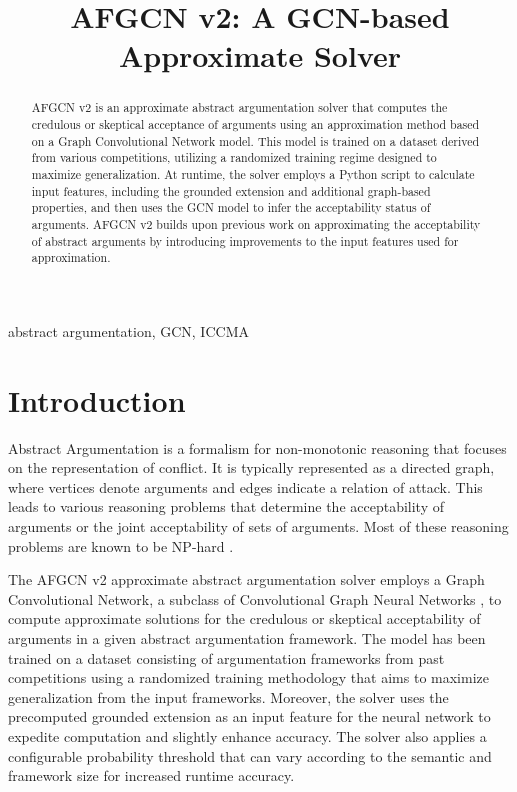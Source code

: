\documentclass[conference]{IEEEtran}
\begin{document}
\title{AFGCN v2: A GCN-based Approximate Solver}

\author{
}

\maketitle

\begin{abstract}
	AFGCN v2 is an approximate abstract argumentation solver that computes the credulous or skeptical acceptance of arguments using an approximation method based on a Graph Convolutional Network model. This model is trained on a dataset derived from various competitions, utilizing a randomized training regime designed to maximize generalization. At runtime, the solver employs a Python script to calculate input features, including the grounded extension and additional graph-based properties, and then uses the GCN model to infer the acceptability status of arguments. AFGCN v2 builds upon previous work on approximating the acceptability of abstract arguments by introducing improvements to the input features used for approximation.
\end{abstract}

\begin{IEEEkeywords}
abstract argumentation, GCN, ICCMA
\end{IEEEkeywords}


\section{Introduction}
Abstract Argumentation is a formalism for non-monotonic reasoning that focuses on the representation of conflict. It is typically represented as a directed graph, where vertices denote arguments and edges indicate a relation of attack. This leads to various reasoning problems that determine the acceptability of arguments or the joint acceptability of sets of arguments. Most of these reasoning problems are known to be NP-hard \cite{Charwat2015,Woltran2014}.

The AFGCN v2 approximate abstract argumentation solver employs a Graph Convolutional Network, a subclass of Convolutional Graph Neural Networks \cite{Wu2020}, to compute approximate solutions for the credulous or skeptical acceptability of arguments in a given abstract argumentation framework. The model has been trained on a dataset consisting of argumentation frameworks from past competitions using a randomized training methodology that aims to maximize generalization from the input frameworks. Moreover, the solver uses the precomputed grounded extension as an input feature for the neural network to expedite computation and slightly enhance accuracy. The solver also applies a configurable probability threshold that can vary according to the semantic and framework size for increased runtime accuracy.
\end{document}
